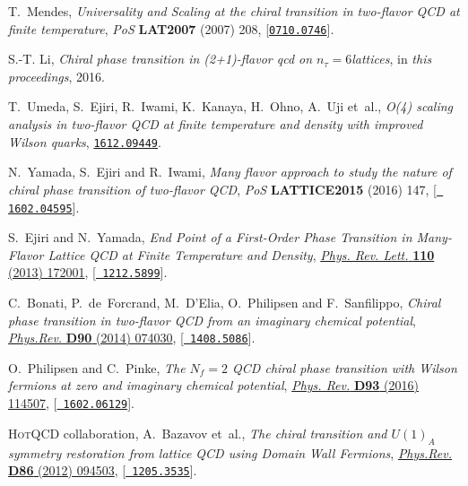 \documentclass{PoS}
\begin{document}
\begin{thebibliography}{100}
T.~Mendes, \emph{{Universality and Scaling at the chiral transition in
  two-flavor QCD at finite temperature}}, {\emph{PoS} {\bf LAT2007} (2007)
  208}, [\href{https://arxiv.org/abs/0710.0746}{{\tt 0710.0746}}].

S.-T. Li, \emph{Chiral phase transition in (2+1)-flavor qcd on
  $n_\tau=6$lattices},  in \emph{{this proceedings}}, 2016.

T.~Umeda, S.~Ejiri, R.~Iwami, K.~Kanaya, H.~Ohno, A.~Uji et~al., \emph{{O(4)
  scaling analysis in two-flavor QCD at finite temperature and density with
  improved Wilson quarks}},
\newblock \href{https://arxiv.org/abs/1612.09449}{{\tt 1612.09449}}.

N.~Yamada, S.~Ejiri and R.~Iwami, \emph{{Many flavor approach to study the
  nature of chiral phase transition of two-flavor QCD}}, {\emph{PoS} {\bf
  LATTICE2015} (2016) 147}, [\href{https://arxiv.org/abs/1602.04595}{{\tt
  1602.04595}}].

S.~Ejiri and N.~Yamada, \emph{{End Point of a First-Order Phase Transition in
  Many-Flavor Lattice QCD at Finite Temperature and Density}},
  \href{http://dx.doi.org/10.1103/PhysRevLett.110.172001}{\emph{Phys. Rev.
  Lett.} {\bf 110} (2013) 172001}, [\href{https://arxiv.org/abs/1212.5899}{{\tt
  1212.5899}}].

C.~Bonati, P.~de~Forcrand, M.~D'Elia, O.~Philipsen and F.~Sanfilippo,
  \emph{{Chiral phase transition in two-flavor QCD from an imaginary chemical
  potential}},
  \href{http://dx.doi.org/10.1103/PhysRevD.90.074030}{\emph{Phys.Rev.} {\bf
  D90} (2014) 074030}, [\href{https://arxiv.org/abs/1408.5086}{{\tt
  1408.5086}}].

O.~Philipsen and C.~Pinke, \emph{{The $N_f=2$ QCD chiral phase transition with
  Wilson fermions at zero and imaginary chemical potential}},
  \href{http://dx.doi.org/10.1103/PhysRevD.93.114507}{\emph{Phys. Rev.} {\bf
  D93} (2016) 114507}, [\href{https://arxiv.org/abs/1602.06129}{{\tt
  1602.06129}}].

{\scshape HotQCD} collaboration, A.~Bazavov et~al., \emph{{The chiral
  transition and $U(1)_A$ symmetry restoration from lattice QCD using Domain
  Wall Fermions}},
  \href{http://dx.doi.org/10.1103/PhysRevD.86.094503}{\emph{Phys.Rev.} {\bf
  D86} (2012) 094503}, [\href{https://arxiv.org/abs/1205.3535}{{\tt
  1205.3535}}].


\end{thebibliography}
\end{document}
